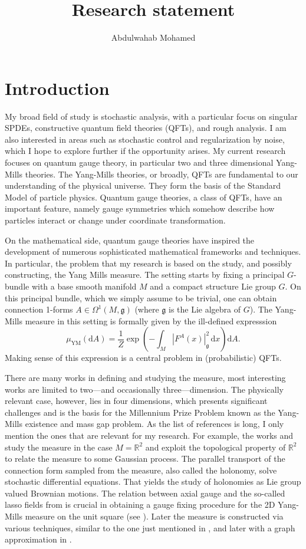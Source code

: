 \documentclass[12pt]{article}
\title{Research statement}
\author{Abdulwahab Mohamed}
\numberwithin{equation}{section}
\theoremstyle{definition}
\theoremstyle{remark}
\newcommand{\diff}{\mathrm{d}}
\newcommand{\R}{\mathbb R}
\newcommand{\1}{\mathbf 1}
\newcommand{\<}{\langle}
\renewcommand{\>}{\rangle}
\begin{document}
\maketitle


\section{Introduction}
My broad field of study is stochastic analysis, with a particular focus on singular SPDEs, constructive quantum field theories (QFTs), and rough analysis. I am also interested in  areas such as stochastic control and regularization by noise, which I hope to explore further if the opportunity arises.
%
My current research focuses on quantum gauge theory, in particular two and three dimensional Yang-Mills theories. The Yang-Mills theories, or broadly,   QFTs are fundamental to our understanding of the physical universe. They form the basis of the Standard Model of particle physics. Quantum gauge theories, a class of QFTs, have an important feature, namely gauge symmetries which somehow describe how particles interact or change under coordinate transformation. 

On the mathematical side, quantum gauge theories have inspired the development of numerous sophisticated mathematical frameworks and techniques. In particular, the problem that my research is based on the study, and possibly constructing, the Yang Mills measure. The setting starts by fixing a principal $G$-bundle with a base smooth manifold $M$ and a compact structure Lie group $G$. On this principal bundle, which we simply assume to be trivial, one can obtain connection 1-forms $A\in \Omega^1(M,\mathfrak g)$ (where  $\mathfrak g$ is the Lie algebra of $G$).  The Yang-Mills measure in this setting is formally given by the ill-defined expresssion
\[
\mu_{\mathrm{YM}}(\diff A)=\frac 1 Z\exp\left(-\int_{M}|F^A(x)|_{\mathfrak g}^2\,\diff x\right)\diff A.
\]
Making sense of this expression is a central problem in (probabilistic) QFTs. 

There are many works in defining and studying the measure, most interesting works are limited to two—and occasionally three—dimension. The physically relevant case, however, lies in four dimensions, which presents significant challenges and is the basis for the Millennium Prize Problem known as the Yang-Mills existence and mass gap problem. As the list of references is long, I only mention the ones that are relevant for my research.  For example, the works \cite{Driver89} and \cite{GKS89} study the measure in the case $M=\R^2$ and exploit the topological property of $\R^2$ to relate the measure to some Gaussian process. The parallel transport of the connection form sampled from the measure, also called the holonomy, solve stochastic differential equations. That yields the study of holonomies as Lie group valued Brownian motions. The relation between axial gauge and the so-called lasso fields from \cite{Driver89} is crucial in obtaining a gauge fixing procedure for the 2D Yang-Mills measure on the unit square (see ). Later the measure is constructed via various techniques, similar to the one just mentioned in \cite{Sengupta97}, and later with a graph approximation in \cite{Levy03}. 
\end{document}
